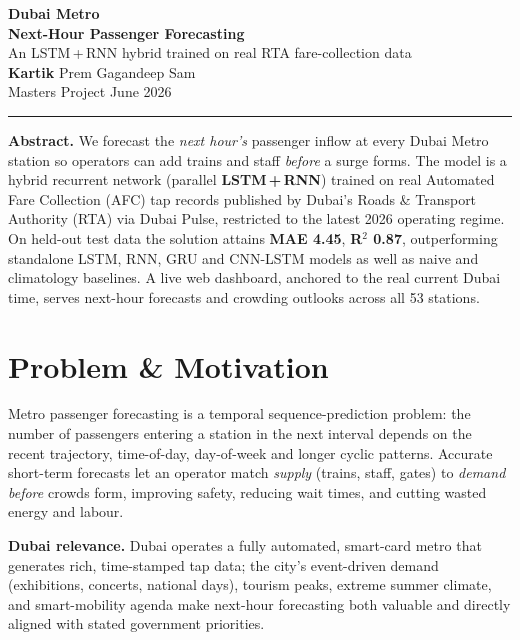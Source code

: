 \documentclass[11pt]{article}
\begin{document}
\begin{center}
  {\Huge\bfseries\color{metroRed} Dubai Metro}\\[2pt]
  {\LARGE\bfseries Next-Hour Passenger Forecasting}\\[6pt]
  {\large An LSTM\,+\,RNN hybrid trained on real RTA fare-collection data}\\[10pt]
  {\normalsize \textbf{Kartik} \;\textbullet\; Prem \;\textbullet\; Gagandeep \;\textbullet\; Sam}\\[2pt]
  {\small Masters Project \;\textbullet\; June 2026}\\[4pt]
  {\small\color{metroGreen}\rule{0.5\textwidth}{1.2pt}}
\end{center}

\noindent\textbf{Abstract.} We forecast the \emph{next hour's} passenger inflow at every Dubai
Metro station so operators can add trains and staff \emph{before} a surge forms. The model is a
hybrid recurrent network (parallel \textbf{LSTM\,+\,RNN}) trained on real Automated Fare
Collection (AFC) tap records published by Dubai's Roads \& Transport Authority (RTA) via Dubai
Pulse, restricted to the latest 2026 operating regime. On held-out test data the solution attains
\textbf{MAE 4.45}, \textbf{R$^2$ 0.87}, outperforming standalone LSTM, RNN, GRU and CNN-LSTM
models as well as naive and climatology baselines. A live web dashboard, anchored to the real
current Dubai time, serves next-hour forecasts and crowding outlooks across all 53 stations.

\section{Problem \& Motivation}
Metro passenger forecasting is a temporal sequence-prediction problem: the number of passengers
entering a station in the next interval depends on the recent trajectory, time-of-day, day-of-week
and longer cyclic patterns. Accurate short-term forecasts let an operator match \emph{supply}
(trains, staff, gates) to \emph{demand} \emph{before} crowds form, improving safety, reducing
wait times, and cutting wasted energy and labour.

\textbf{Dubai relevance.} Dubai operates a fully automated, smart-card metro that generates rich,
time-stamped tap data; the city's event-driven demand (exhibitions, concerts, national days),
tourism peaks, extreme summer climate, and smart-mobility agenda make next-hour forecasting both
valuable and directly aligned with stated government priorities.
\end{document}
